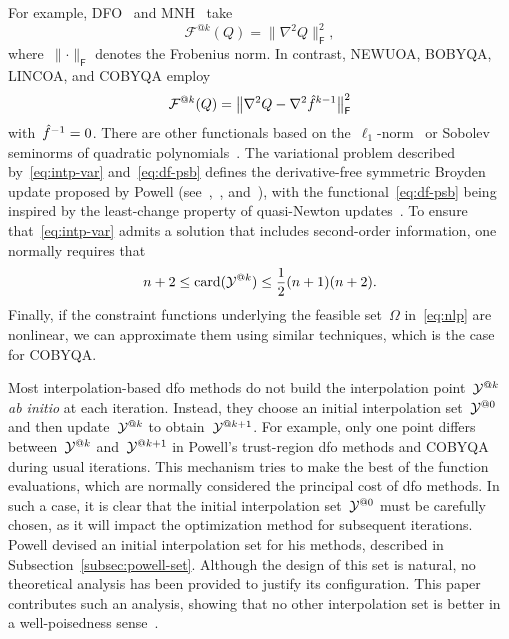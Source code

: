\documentclass{article}
\makeatletter
\newcounter{cite}
\numberwithin{equation}{section}
\theoremstyle{definition}
\theoremstyle{plain}
\theoremstyle{remark}
\DeclareMathOperator{\card}{card}
\newcommand*{\norm}[2][]{#1\lVert#2#1\rVert}
\newcommand*{\obj}{f}
\newcommand*{\objm}[1][]{\hat{\obj}\ifblank{#1}{}{^{#1}}}
\newcommand*{\fset}{\Omega}
\newcommand*{\xpt}[1][]{\mathcal{Y}\ifblank{#1}{}{^{@#1}}}
\makeatother
\begin{document}
For example, DFO~\cite{Conn_Scheinberg_Toint_1998} and MNH~\cite{Wild_2008} take
\begin{equation}
    \label{eq:mnh}
    \mathcal{F}^{@k}(Q) = \norm[\big]{\nabla^2 Q}_{\mathsf{F}}^2,
\end{equation}
where~$\norm{\cdot}_{\mathsf{F}}$ denotes the Frobenius norm.
In contrast, NEWUOA, BOBYQA, LINCOA, and COBYQA employ
\begin{equation}
    \label{eq:df-psb}
    \mathcal{F}^{@k}(Q) = \norm[\big]{\nabla^2 Q - \nabla^2 \objm[k - 1]}_{\mathsf{F}}^2
\end{equation}
with~$\objm[-1] = 0$.
There are other functionals based on the~$\ell_1$-norm~\cite{Bandeira_Scheinberg_Vicente_2012} or Sobolev seminorms of quadratic polynomials~\cite{Zhang_2014,Xie_Yuan_2022}.
The variational problem described by~\eqref{eq:intp-var} and~\eqref{eq:df-psb} defines the derivative-free symmetric
Broyden update proposed by Powell (see~\cite{Powell_2004a,Powell_2013},~\cite[\S~3.6]{Zhang_2012}, and~\cite[\S~2.4.2]{Ragonneau_2022}), with the functional~\eqref{eq:df-psb} being inspired by the least-change property of quasi-Newton updates~\cite{Dennis_Schnabel_1979}.
To ensure that~\eqref{eq:intp-var} admits a solution that includes second-order information, one normally requires that
\begin{equation*}
    n + 2 \le \card(\xpt[k]) \le \frac{1}{2} (n + 1) (n + 2).
\end{equation*}
Finally, if the constraint functions underlying the feasible set~$\fset$ in~\eqref{eq:nlp} are nonlinear, we can approximate them using similar techniques, which is the case for COBYQA.

Most interpolation-based \gls{dfo} methods do not build the interpolation point~$\xpt[k]$ \emph{ab initio} at each iteration.
Instead, they choose an initial interpolation set~$\xpt[0]$ and then  update~$\xpt[k]$ to obtain~$\xpt[k + 1]$.
For example, only one point differs between~$\xpt[k]$ and~$\xpt[k + 1]$ in Powell's trust-region \gls{dfo} methods and COBYQA during usual iterations.
This mechanism tries to make the best of the function evaluations, which are normally considered the principal cost of \gls{dfo} methods.
In such a case, it is clear that the initial interpolation set~$\xpt[0]$ must be carefully chosen, as it will impact the optimization method for subsequent iterations.
Powell devised an initial interpolation set for his methods, described in Subsection~\ref{subsec:powell-set}.
Although the design of this set is natural, no theoretical analysis has been provided to justify its configuration.
This paper contributes such an analysis, showing that no other interpolation set is better in a well-poisedness sense~\cite[\S~3.3]{Conn_Scheinberg_Vicente_2009}.
\end{document}
